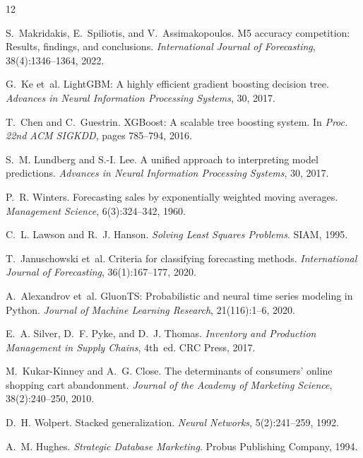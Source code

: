 \documentclass{article}
\begin{document}
\begingroup
\small
\begin{thebibliography}{12}

S.~Makridakis, E.~Spiliotis, and V.~Assimakopoulos.
\newblock M5 accuracy competition: Results, findings, and conclusions.
\newblock \emph{International Journal of Forecasting}, 38(4):1346--1364, 2022.

G.~Ke et~al.
\newblock LightGBM: A highly efficient gradient boosting decision tree.
\newblock \emph{Advances in Neural Information Processing Systems}, 30, 2017.

T.~Chen and C.~Guestrin.
\newblock XGBoost: A scalable tree boosting system.
\newblock In \emph{Proc. 22nd ACM SIGKDD}, pages 785--794, 2016.

S.~M. Lundberg and S.-I. Lee.
\newblock A unified approach to interpreting model predictions.
\newblock \emph{Advances in Neural Information Processing Systems}, 30, 2017.

P.~R. Winters.
\newblock Forecasting sales by exponentially weighted moving averages.
\newblock \emph{Management Science}, 6(3):324--342, 1960.

C.~L. Lawson and R.~J. Hanson.
\newblock \emph{Solving Least Squares Problems}.
\newblock SIAM, 1995.

T.~Januschowski et~al.
\newblock Criteria for classifying forecasting methods.
\newblock \emph{International Journal of Forecasting}, 36(1):167--177, 2020.

A.~Alexandrov et~al.
\newblock GluonTS: Probabilistic and neural time series modeling in Python.
\newblock \emph{Journal of Machine Learning Research}, 21(116):1--6, 2020.

E.~A. Silver, D.~F. Pyke, and D.~J. Thomas.
\newblock \emph{Inventory and Production Management in Supply Chains}, 4th~ed.
\newblock CRC Press, 2017.

M.~Kukar-Kinney and A.~G. Close.
\newblock The determinants of consumers' online shopping cart abandonment.
\newblock \emph{Journal of the Academy of Marketing Science},
  38(2):240--250, 2010.

D.~H. Wolpert.
\newblock Stacked generalization.
\newblock \emph{Neural Networks}, 5(2):241--259, 1992.

A.~M. Hughes.
\newblock \emph{Strategic Database Marketing}.
\newblock Probus Publishing Company, 1994.

\end{thebibliography}
\endgroup
\end{document}
